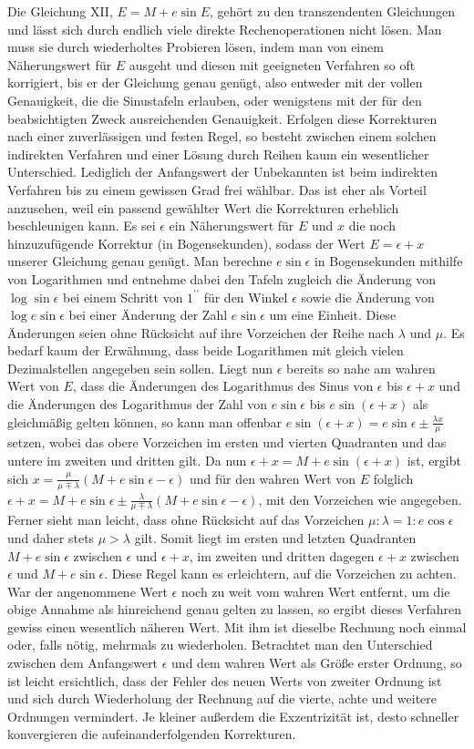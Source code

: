Die Gleichung XII, $E = M + e\sin E$, gehört zu den transzendenten Gleichungen und lässt sich durch endlich viele direkte Rechenoperationen nicht lösen. Man muss sie durch wiederholtes Probieren lösen, indem man von einem Näherungswert für $E$ ausgeht und diesen mit geeigneten Verfahren so oft korrigiert, bis er der Gleichung genau genügt, also entweder mit der vollen Genauigkeit, die die Sinustafeln erlauben, oder wenigstens mit der für den beabsichtigten Zweck ausreichenden Genauigkeit. Erfolgen diese Korrekturen nach einer zuverlässigen und festen Regel, so besteht zwischen einem solchen indirekten Verfahren und einer Lösung durch Reihen kaum ein wesentlicher Unterschied. Lediglich der Anfangswert der Unbekannten ist beim indirekten Verfahren bis zu einem gewissen Grad frei wählbar. Das ist eher als Vorteil anzusehen, weil ein passend gewählter Wert die Korrekturen erheblich beschleunigen kann. Es sei $\epsilon$ ein Näherungswert für $E$ und $x$ die noch hinzuzufügende Korrektur (in Bogensekunden), sodass der Wert $E = \epsilon + x$ unserer Gleichung genau genügt. Man berechne $e\sin\epsilon$ in Bogensekunden mithilfe von Logarithmen und entnehme dabei den Tafeln zugleich die Änderung von $\log\sin\epsilon$ bei einem Schritt von $1^{\prime\prime}$ für den Winkel $\epsilon$ sowie die Änderung von $\log e\sin\epsilon$ bei einer Änderung der Zahl $e\sin\epsilon$ um eine Einheit. Diese Änderungen seien ohne Rücksicht auf ihre Vorzeichen der Reihe nach $\lambda$ und $\mu$. Es bedarf kaum der Erwähnung, dass beide Logarithmen mit gleich vielen Dezimalstellen angegeben sein sollen. Liegt nun $\epsilon$ bereits so nahe am wahren Wert von $E$, dass die Änderungen des Logarithmus des Sinus von $\epsilon$ bis $\epsilon+x$ und die Änderungen des Logarithmus der Zahl von $e\sin\epsilon$ bis $e\sin(\epsilon+x)$ als gleichmäßig gelten können, so kann man offenbar $e\sin(\epsilon+x) = e\sin\epsilon \pm \frac{\lambda x}{\mu}$ setzen, wobei das obere Vorzeichen im ersten und vierten Quadranten und das untere im zweiten und dritten gilt. Da nun $\epsilon+x = M+e\sin(\epsilon+x)$ ist, ergibt sich $x = \frac{\mu}{\mu\mp\lambda}(M+e\sin\epsilon-\epsilon)$ und für den wahren Wert von $E$ folglich $\epsilon+x = M+e\sin\epsilon \pm \frac{\lambda}{\mu\mp\lambda}(M+e\sin\epsilon-\epsilon)$, mit den Vorzeichen wie angegeben. Ferner sieht man leicht, dass ohne Rücksicht auf das Vorzeichen $\mu:\lambda = 1:e\cos\epsilon$ und daher stets $\mu > \lambda$ gilt. Somit liegt im ersten und letzten Quadranten $M+e\sin\epsilon$ zwischen $\epsilon$ und $\epsilon+x$, im zweiten und dritten dagegen $\epsilon+x$ zwischen $\epsilon$ und $M+e\sin\epsilon$. Diese Regel kann es erleichtern, auf die Vorzeichen zu achten. War der angenommene Wert $\epsilon$ noch zu weit vom wahren Wert entfernt, um die obige Annahme als hinreichend genau gelten zu lassen, so ergibt dieses Verfahren gewiss einen wesentlich näheren Wert. Mit ihm ist dieselbe Rechnung noch einmal oder, falls nötig, mehrmals zu wiederholen. Betrachtet man den Unterschied zwischen dem Anfangswert $\epsilon$ und dem wahren Wert als Größe erster Ordnung, so ist leicht ersichtlich, dass der Fehler des neuen Werts von zweiter Ordnung ist und sich durch Wiederholung der Rechnung auf die vierte, achte und weitere Ordnungen vermindert. Je kleiner außerdem die Exzentrizität ist, desto schneller konvergieren die aufeinanderfolgenden Korrekturen.
